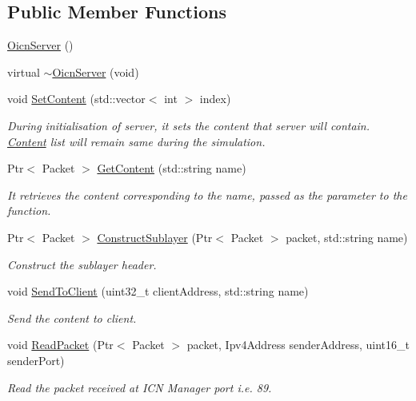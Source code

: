 \subsection*{Public Member Functions}
\begin{DoxyCompactItemize}
\item 
\hyperlink{classns3_1_1OicnServer_ab9f66365f8d1a5f08e8c049aa9f932ef}{Oicn\-Server} ()
\item 
virtual \hyperlink{classns3_1_1OicnServer_ab897c892c1bad60b83f770a53e76547e}{$\sim$\-Oicn\-Server} (void)
\item 
void \hyperlink{classns3_1_1OicnServer_a61860ecd2544eb4e7774c7c2c19da63c}{Set\-Content} (std\-::vector$<$ int $>$ index)
\begin{DoxyCompactList}\small\item\em During initialisation of server, it sets the content that server will contain. \hyperlink{classns3_1_1Content}{Content} list will remain same during the simulation. \end{DoxyCompactList}\item 
Ptr$<$ Packet $>$ \hyperlink{classns3_1_1OicnServer_a1813b07463e62f0c011a5ab169174c94}{Get\-Content} (std\-::string name)
\begin{DoxyCompactList}\small\item\em It retrieves the content corresponding to the name, passed as the parameter to the function. \end{DoxyCompactList}\item 
Ptr$<$ Packet $>$ \hyperlink{classns3_1_1OicnServer_ae543f14a173b0e294a78694f1f91f15f}{Construct\-Sublayer} (Ptr$<$ Packet $>$ packet, std\-::string name)
\begin{DoxyCompactList}\small\item\em Construct the sublayer header. \end{DoxyCompactList}\item 
void \hyperlink{classns3_1_1OicnServer_a8dd7f5f546baf72d2eeef2ba78c3b797}{Send\-To\-Client} (uint32\-\_\-t client\-Address, std\-::string name)
\begin{DoxyCompactList}\small\item\em Send the content to client. \end{DoxyCompactList}\item 
void \hyperlink{classns3_1_1OicnServer_abd1ea8c1e1332d232c2a2dbc559ea769}{Read\-Packet} (Ptr$<$ Packet $>$ packet, Ipv4\-Address sender\-Address, uint16\-\_\-t sender\-Port)
\begin{DoxyCompactList}\small\item\em Read the packet received at I\-C\-N Manager port i.\-e. 89. \end{DoxyCompactList}\item 

\end{DoxyCompactItemize}
